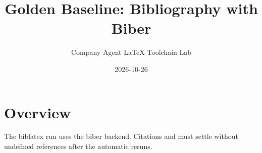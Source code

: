 \documentclass[11pt]{article}
\begin{document}
\title{Golden Baseline: Bibliography with Biber}
\author{Company Agent LaTeX Toolchain Lab}
\date{2026-10-26}
\maketitle

\section{Overview}
The biblatex run uses the biber backend. Citations \cite{knuth1984} and
\cite{lamport1994} must settle without undefined references after the
automatic reruns.

\printbibliography
\end{document}
